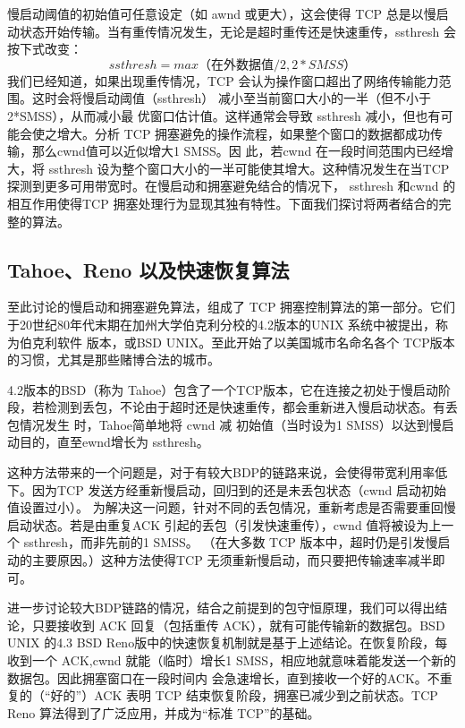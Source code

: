 慢启动阈值的初始值可任意设定（如 awnd 或更大），这会使得 TCP 总是以慢启动状态开始传输。当有重传情况发生，无论是超时重传还是快速重传，ssthresh 会按下式改变：
\begin{equation}
    ssthresh = max（在外数据值 /2, 2*SMSS）
\end{equation}
我们已经知道，如果出现重传情况，TCP 会认为操作窗口超出了网络传输能力范围。这时会将慢启动阈值（ssthresh） 减小至当前窗口大小的一半（但不小于 2*SMSS），从而减小最
优窗口估计值。这样通常会导致 ssthresh 减小，但也有可能会使之增大。分析 TCP 拥塞避免的操作流程，如果整个窗口的数据都成功传输，那么cwnd值可以近似增大1 SMSS。因
此，若cwnd 在一段时间范围内已经增大，将 ssthresh 设为整个窗口大小的一半可能使其增大。这种情况发生在当TCP 探测到更多可用带宽时。在慢启动和拥塞避免结合的情况下，
ssthresh 和cwnd 的相互作用使得TCP 拥塞处理行为显现其独有特性。下面我们探讨将两者结合的完整的算法。

\subsection{Tahoe、Reno 以及快速恢复算法}
至此讨论的慢启动和拥塞避免算法，组成了 TCP 拥塞控制算法的第一部分。它们于20世纪80年代末期在加州大学伯克利分校的4.2版本的UNIX 系统中被提出，称为伯克利软件
版本，或BSD UNIX。至此开始了以美国城市名命名各个 TCP版本的习惯，尤其是那些赌博合法的城市。

4.2版本的BSD（称为 Tahoe）包含了一个TCP版本，它在连接之初处于慢启动阶段，若检测到丢包，不论由于超时还是快速重传，都会重新进入慢启动状态。有丢包情况发生
时，Tahoe简单地将 cwnd 减 初始值（当时设为1 SMSS）以达到慢启动目的，直至ewnd增长为 ssthresh。

这种方法带来的一个问题是，对于有较大BDP的链路来说，会使得带宽利用率低下。因为TCP 发送方经重新慢启动，回归到的还是未丢包状态（cwnd 启动初始值设置过小）。
为解决这一问题，针对不同的丢包情况，重新考虑是否需要重回慢启动状态。若是由重复ACK 引起的丢包（引发快速重传），cwnd 值将被设为上一个 ssthresh，而非先前的1 SMSS。
（在大多数 TCP 版本中，超时仍是引发慢启动的主要原因。）这种方法使得TCP 无须重新慢启动，而只要把传输速率减半即可。

进一步讨论较大BDP链路的情况，结合之前提到的包守恒原理，我们可以得出结论，只要接收到 ACK 回复（包括重传 ACK），就有可能传输新的数据包。BSD UNIX 的4.3 BSD
Reno版中的快速恢复机制就是基于上述结论。在恢复阶段，每收到一个 ACK,cwnd 就能（临时）增长1 SMSS，相应地就意味着能发送一个新的数据包。因此拥塞窗口在一段时间内
会急速增长，直到接收一个好的ACK。不重复的（“好的”）ACK 表明 TCP 结束恢复阶段，拥塞已减少到之前状态。TCP Reno 算法得到了广泛应用，并成为“标准 TCP”的基础。

